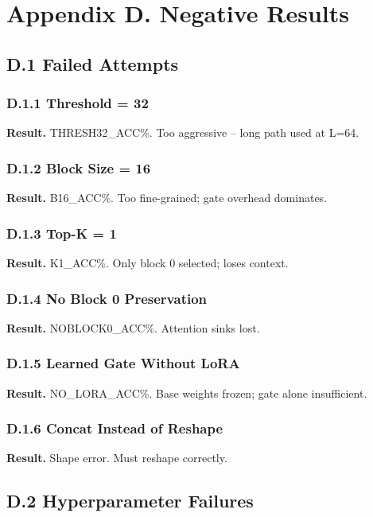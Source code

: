 \section{Appendix D. Negative Results}

\subsection{D.1 Failed Attempts}

\subsubsection{D.1.1 Threshold = 32}

\textbf{Result.} {{THRESH32\_ACC}}\%. Too aggressive -- long path used at L=64.

\subsubsection{D.1.2 Block Size = 16}

\textbf{Result.} {{B16\_ACC}}\%. Too fine-grained; gate overhead dominates.

\subsubsection{D.1.3 Top-K = 1}

\textbf{Result.} {{K1\_ACC}}\%. Only block 0 selected; loses context.

\subsubsection{D.1.4 No Block 0 Preservation}

\textbf{Result.} {{NOBLOCK0\_ACC}}\%. Attention sinks lost.

\subsubsection{D.1.5 Learned Gate Without LoRA}

\textbf{Result.} {{NO\_LORA\_ACC}}\%. Base weights frozen; gate alone insufficient.

\subsubsection{D.1.6 Concat Instead of Reshape}

\textbf{Result.} Shape error. Must reshape correctly.

\subsection{D.2 Hyperparameter Failures}

